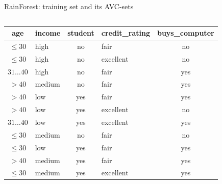 \documentclass[aspectratio=169,t,table]{beamer}
\begin{document}
  {
    \begin{frame}{RainForest: training set and its AVC-sets}
      \begin{columns}
        \begin{column}{0.6\textwidth}
          \begin{tabular}{|c|l|c|l|c|}
            \hline
            \cellcolor{blue!20}age & \cellcolor{blue!20}income & \cellcolor{blue!20}student & \cellcolor{blue!20}credit\_rating & \cellcolor{brown!20}buys\_computer \\\hline
            \cellcolor{yellow!20}$\leq30$ & \cellcolor{yellow!20}high & \cellcolor{yellow!20}no & \cellcolor{yellow!20}fair & \cellcolor{red!20}no \\\hline
            \cellcolor{yellow!20}$\leq30$ & \cellcolor{yellow!20}high & \cellcolor{yellow!20}no & \cellcolor{yellow!20}excellent & \cellcolor{red!20}no \\\hline
            \cellcolor{yellow!20}$31\ldots40$ & \cellcolor{yellow!20}high & \cellcolor{yellow!20}no & \cellcolor{yellow!20}fair & \cellcolor{green!20}yes \\\hline
            \cellcolor{yellow!20}$>40$ & \cellcolor{yellow!20}medium & \cellcolor{yellow!20}no & \cellcolor{yellow!20}fair & \cellcolor{green!20}yes \\\hline
            \cellcolor{yellow!20}$>40$ & \cellcolor{yellow!20}low & \cellcolor{yellow!20}yes & \cellcolor{yellow!20}fair & \cellcolor{green!20}yes \\\hline
            \cellcolor{yellow!20}$>40$ & \cellcolor{yellow!20}low & \cellcolor{yellow!20}yes & \cellcolor{yellow!20}excellent & \cellcolor{red!20}no \\\hline
            \cellcolor{yellow!20}$31\ldots40$ & \cellcolor{yellow!20}low & \cellcolor{yellow!20}yes & \cellcolor{yellow!20}excellent & \cellcolor{green!20}yes \\\hline
            \cellcolor{yellow!20}$\leq30$ & \cellcolor{yellow!20}medium & \cellcolor{yellow!20}no & \cellcolor{yellow!20}fair & \cellcolor{red!20}no \\\hline
            \cellcolor{yellow!20}$\leq30$ & \cellcolor{yellow!20}low & \cellcolor{yellow!20}yes & \cellcolor{yellow!20}fair & \cellcolor{green!20}yes \\\hline
            \cellcolor{yellow!20}$>40$ & \cellcolor{yellow!20}medium & \cellcolor{yellow!20}yes & \cellcolor{yellow!20}fair & \cellcolor{green!20}yes \\\hline
            \cellcolor{yellow!20}$\leq30$ & \cellcolor{yellow!20}medium & \cellcolor{yellow!20}yes & \cellcolor{yellow!20}excellent & \cellcolor{green!20}yes \\\hline

\end{tabular}
\end{column}
\end{columns}
\end{frame}}
\end{document}
